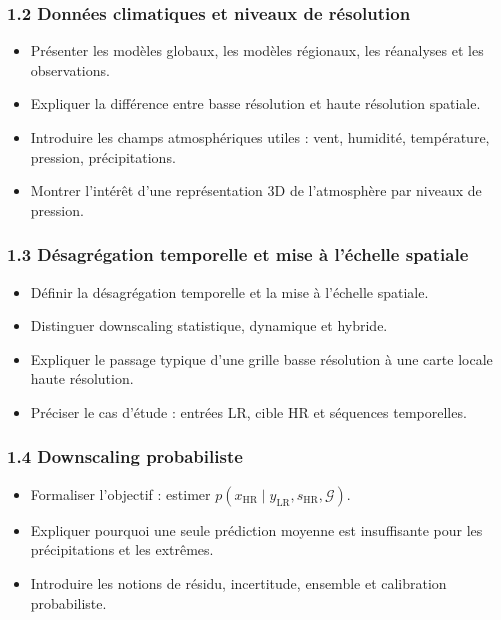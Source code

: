 \documentclass[12pt,a4paper]{article}
\begin{document}
\subsubsection*{1.2 Donn\'ees climatiques et niveaux de r\'esolution}
\begin{itemize}
    \item Pr\'esenter les mod\`eles globaux, les mod\`eles r\'egionaux, les r\'eanalyses et les observations.
    \item Expliquer la diff\'erence entre basse r\'esolution et haute r\'esolution spatiale.
    \item Introduire les champs atmosph\'eriques utiles : vent, humidit\'e, temp\'erature, pression, pr\'ecipitations.
    \item Montrer l'int\'er\^et d'une repr\'esentation 3D de l'atmosph\`ere par niveaux de pression.
\end{itemize}

\subsubsection*{1.3 D\'esagr\'egation temporelle et mise \`a l'\'echelle spatiale}
\begin{itemize}
    \item D\'efinir la d\'esagr\'egation temporelle et la mise \`a l'\'echelle spatiale.
    \item Distinguer downscaling statistique, dynamique et hybride.
    \item Expliquer le passage typique d'une grille basse r\'esolution \`a une carte locale haute r\'esolution.
    \item Pr\'eciser le cas d'\'etude : entr\'ees LR, cible HR et s\'equences temporelles.
\end{itemize}

\subsubsection*{1.4 Downscaling probabiliste}
\begin{itemize}
    \item Formaliser l'objectif : estimer $p(x_{\mathrm{HR}} \mid y_{\mathrm{LR}}, s_{\mathrm{HR}}, \mathcal{G})$.
    \item Expliquer pourquoi une seule pr\'ediction moyenne est insuffisante pour les pr\'ecipitations et les extr\^emes.
    \item Introduire les notions de r\'esidu, incertitude, ensemble et calibration probabiliste.
\end{itemize}
\end{document}
